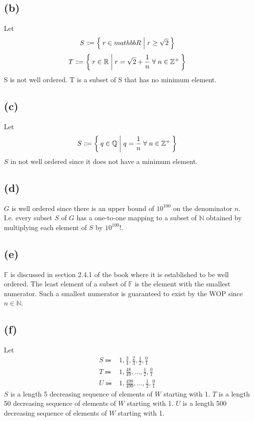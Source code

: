 \documentclass{article}
\begin{document}
\subsection{(b)}
Let
\[
	S \Coloneqq \Set{r \in mathbb{R} | r \geq \sqrt{2}}
\]
\[
	T \Coloneqq \Set{r \in \mathbb{R} | r = \sqrt{2} + \frac{1}{n} \; \forall \; n \in \mathbb{Z^+}}
\]
S is not well ordered. T is a subset of S that has no minimum element.

\subsection{(c)}
Let
\[
	S \Coloneqq \Set{q \in \mathbb{Q} | q = \frac{1}{n} \; \forall \; n \in \mathbb{Z^+}}
\]
$S$ in not well ordered since it does not have a minimum element.

\subsection{(d)}
$G$ is well ordered since there is an upper bound of $10^{100}$ on the denominator $n$. I.e. every subset $S$ of $G$ has a one-to-one mapping to a subset of $\mathbb{N}$ obtained by multiplying each element of $S$ by $10^{100}!$.

\subsection{(e)}
$\mathbb{F}$ is discussed in section 2.4.1 of the book where it is established to be well ordered. The least element of a subset of $\mathbb{F}$ is the element with the smallest numerator.  Such a smallest numerator is guaranteed to exist by the WOP since $n \in \mathbb{N}$.

\subsection{(f)}
Let
\begin{align*}
	S \Coloneqq & 1, \frac{3}{4}, \frac{2}{3}, \frac{1}{2}, \frac{0}{1} \\
	T \Coloneqq & 1, \frac{48}{49}, ..., \frac{1}{2}, \frac{0}{1}       \\
	U \Coloneqq & 1, \frac{498}{499}, ..., \frac{1}{2}, \frac{0}{1}
\end{align*}
$S$ is a length 5 decreasing sequence of elements of $W$ starting with 1. $T$ is a length 50 decreasing sequence of elements of $W$ starting with 1. $U$ is a length 500 decreasing sequence of elements of $W$ starting with 1.
\end{document}
